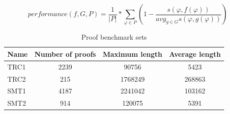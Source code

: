 \documentclass{llncs}
\begin{document}
\begin{equation} \label{eq:space}
  \mathit{performance}(f, G, P) = \frac{1}{|P|} * \sum_{\varphi \in P}{\left( 1 -
    \frac{
      s(\varphi,f(\varphi))
    }{
        \mathit{avg}_{g\in G}{s(\varphi,g(\varphi))}
    } \right)
  }
\end{equation}

\begin{table}[tb]
	\centering
	\setlength{\tabcolsep}{8pt}
	\begin{tabular}{|l|c|c|c|}
		\hline
		\textbf{Name} & \textbf{Number of proofs} & \textbf{Maximum length} & \textbf{Average length} \\ 
		\hline \hline
		TRC1 & 2239 & 90756   & 5423   \\ \hline
		TRC2 & 215	& 1768249 & 268863 \\ \hline
    SMT1 & 4187 & 2241042 & 103162 \\ \hline
    SMT2 & 914  & 120075  & 5391  \\ 
		\hline   
	\end{tabular}
	\caption{Proof benchmark sets}
	\label{tab:benchmarks}
\end{table}
\end{document}
